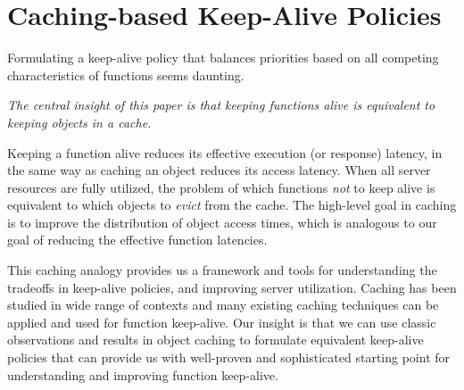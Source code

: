 
\section{Caching-based Keep-Alive Policies}
\label{sec:cache-keep-alive}
\vspace*{\subsecspace}


Formulating a keep-alive policy that balances priorities based on all competing characteristics of functions seems daunting. 
\vspace*{-8pt}
\begin{framed}
  \vspace*{-6pt}
  \noindent \emph{The central insight of this paper is that keeping functions alive is equivalent to keeping objects in a cache.}
  \vspace*{-6pt}
\end{framed}
\vspace*{-8pt}

\noindent Keeping a function alive reduces its effective execution (or response) latency, in the same way as caching an object reduces its access latency. 
When all server resources are fully utilized, the problem of which functions \emph{not} to keep alive is equivalent to which objects to \emph{evict} from the cache. 
The high-level goal in caching is to improve the distribution of object access times, which is analogous to our goal of reducing the effective function latencies. 


This caching analogy provides us a framework and tools for understanding the tradeoffs in keep-alive policies, and improving server utilization. 
Caching has been studied in wide range of contexts and many existing caching techniques can be applied and used for function keep-alive. 
Our insight is that we can use classic observations and results in object caching to formulate equivalent keep-alive policies that can provide us with well-proven and sophisticated starting point for understanding and improving function keep-alive.  


